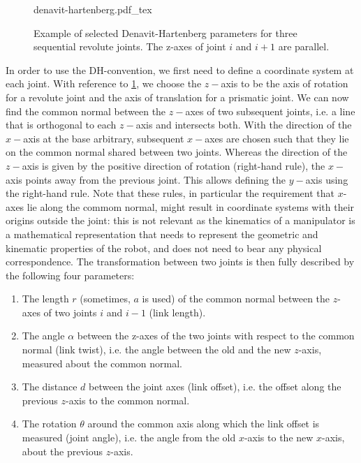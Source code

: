 \begin{figure}[!t]
    \centering
    \def\svgwidth{\textwidth}
    {denavit-hartenberg.pdf_tex}
    \caption{Example of selected Denavit-Hartenberg parameters for three sequential revolute joints. The z-axes of joint $i$ and $i+1$ are parallel.}
    \label{fig:denavit}
\end{figure}

In order to use the DH-convention, we first need to define a coordinate system at each joint. With reference to \cref{fig:denavit}, we choose the $z-$axis to be the axis of rotation for a revolute joint and the axis of translation for a prismatic joint.
We can now find the common normal between the $z-$axes of two subsequent joints, i.e. a line that is orthogonal to each $z-$axis and intersects both.
With the direction of the $x-$axis at the base arbitrary, subsequent $x-$axes are chosen such that they lie on the common normal shared between two joints.
Whereas the direction of the $z-$axis is given by the positive direction of rotation (right-hand rule), the $x-$axis points away from the previous joint.
This allows defining the $y-$axis using the right-hand rule.
Note that these rules, in particular the requirement that $x$-axes lie along the commom normal, might result in coordinate systems with their origins outside the joint: this is not relevant as the kinematics of a manipulator is a mathematical representation that needs to represent the geometric and kinematic properties of the robot, and does not need to bear any physical correspondence.
%
The transformation between two joints is then fully described by the following four parameters:
\begin{enumerate}
\item The length $r$ (sometimes, $a$ is used) of the common normal between the $z$-axes of two joints $i$ and $i-1$ (link length).
\item The angle $ \alpha$ between the z-axes of the two joints with respect to the common normal (link twist), i.e. the angle between the old and the new $z$-axis, measured about the common normal.
\item The distance $d$ between the joint axes (link offset), i.e. the offset along the previous $z$-axis to the common normal.
\item The rotation $ \theta$ around the common axis along which the link offset is measured (joint angle), i.e. the angle from the old $x$-axis to the new $x$-axis, about the previous $z$-axis.
\end{enumerate}

